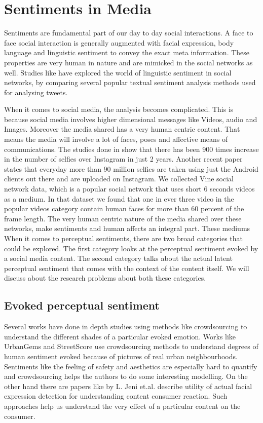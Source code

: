 \section{Sentiments in Media}
Sentiments are fundamental part of our day to day social interactions. A face to face social interaction is generally augmented with facial expression, body language and linguistic sentiment to convey the exact meta information. These properties are very human in nature and are mimicked in the social networks as well. Studies like \cite{Joo2014b} have explored the world of linguistic sentiment in social networks, by comparing several popular textual sentiment analysis methods used for analysing tweets. 
\par
When it comes to social media, the analysis becomes complicated. This is because social media involves higher dimensional messages like Videos, audio and Images. Moreover the media shared has a very human centric content. That means the media will involve a lot of faces, poses and affective means of communications. The studies done in \cite{Souza2015} show that there has been 900 times increase in the number of selfies over Instagram in just 2 years. Another recent paper \cite{goodSelfie} states that everyday more than 90 million selfies are taken using just the Android clients out there and are uploaded on Instagram. We collected Vine social network data, which is a popular social network that uses short 6 seconds videos as a medium. In that dataset we found that  one in ever three video in the popular videos category contain human faces for more than 60 percent of the frame length. 
The very human centric nature of the media shared over these networks, make sentiments and human affects an integral part. These mediums 
When it comes to perceptual sentiments, there are two broad categories that could be explored. The first category looks at the perceptual sentiment evoked by a social media content. The second category talks about the actual latent perceptual sentiment that comes with the context of the content itself. We will discuss about the research problems about both these categories.

\subsection{ Evoked perceptual sentiment }
Several works have done in depth studies using methods like crowdsourcing to understand the different shades of a particular evoked emotion. Works like UrbanGems \cite{urbanGems} and StreetScore \cite{nikhil} use crowdsourcing methods to understand degrees of human sentiment evoked because of pictures of real urban neighbourhoods. Sentiments like the feeling of safety and aesthetics are especially hard to quantify and crowdsourcing helps the authors to do some interesting modelling. On the other hand there are papers like \cite{jeni20123d} by L. Jeni et.al. describe utility of actual facial expression detection for understanding content consumer reaction. Such approaches help us understand the very effect of a particular content on the consumer. 

